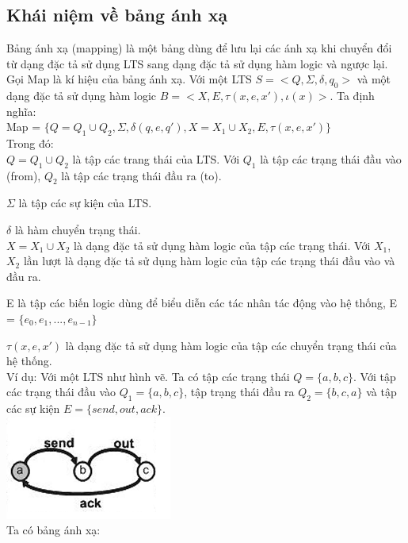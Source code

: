 \documentclass{article}
\begin{document}
\begin{flushleft}
		\subsection{Khái niệm về bảng ánh xạ}
			Bảng ánh xạ (mapping) là một bảng dùng để lưu lại các ánh xạ khi chuyển đổi từ dạng đặc tả sử dụng LTS sang dạng đặc tả sử dụng hàm logic và ngược lại.\\
			Gọi Map là kí hiệu của bảng ánh xạ. Với một LTS $S = <Q, \Sigma, \delta, q_{0}>$ và một dạng đặc tả sử dụng hàm logic $B = <X, E, \tau(x, e, x'), \iota(x)>$. Ta định nghĩa:\\
			Map = $\{Q = Q_1 \cup Q_2, \Sigma, \delta(q, e, q'), X = X_1 \cup X_2, E, \tau(x, e, x')\}$\\
			Trong đó:\\
			$Q = Q_1 \cup Q_2$ là tập các trang thái của LTS. Với $Q_1$ là tập các trạng thái đầu vào (from), $Q_2$ là tập các trạng thái đầu ra (to).\\
			\item $\Sigma$ là tập các sự kiện của LTS.\\
			\item $\delta$ là hàm chuyển trạng thái.\\
			$X = X_1 \cup X_2$ là dạng đặc tả sử dụng hàm logic của tập các trạng thái. Với $X_1$, $X_2$ lần lượt là dạng đặc tả sử dụng hàm logic của tập các trạng thái đầu vào và đầu ra.\\
			\item E là tập các biến logic dùng để biểu diễn các tác nhân tác động vào hệ thống, E = $\{e_0, e_1, ..., e_{n-1}\}$
			\item $\tau(x, e, x')$ là dạng đặc tả sử dụng hàm logic của tập các chuyển trạng thái của hệ thống.\\
			Ví dụ: Với một LTS như hình vẽ. Ta có tập các trạng thái $Q = \{a, b, c\}$. Với tập các trạng thái đầu vào $Q_{1} = \{a, b, c\}$, tập trạng thái đầu ra $Q_{2} = \{b, c, a\}$ và tập các sự kiện $E = \{send, out, ack\}$.\\
			\includegraphics{hinh1.png}\\
			Ta có bảng ánh xạ:
			\begin{table}[!ht]

\end{table}
\end{flushleft}
\end{document}
